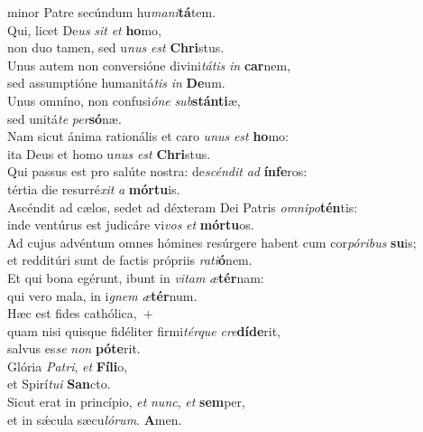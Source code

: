 \oddverse minor Patre secúndum hu\textit{ma}\textit{ni}\textbf{tá}tem.\\
\evenverse Qui, licet De\textit{us} \textit{sit} \textit{et} \textbf{ho}mo,~\*\\
\evenverse non duo tamen, sed u\textit{nus} \textit{est} \textbf{Chri}stus.\\
\oddverse Unus autem non conversióne divini\textit{tá}\textit{tis} \textit{in} \textbf{car}nem,~\*\\
\oddverse sed assumptióne humanitá\textit{tis} \textit{in} \textbf{De}um.\\
\evenverse Unus omníno, non confusi\textit{ó}\textit{ne} \textit{sub}\textbf{stán}\textbf{ti}æ,~\*\\
\evenverse sed unitá\textit{te} \textit{per}\textbf{só}næ.\\
\oddverse Nam sicut ánima rationális et caro \textit{u}\textit{nus} \textit{est} \textbf{ho}mo:~\*\\
\oddverse ita Deus et homo u\textit{nus} \textit{est} \textbf{Chri}stus.\\
\evenverse Qui passus est pro salúte nostra: de\textit{scén}\textit{dit} \textit{ad} \textbf{ín}\textbf{fe}ros:~\*\\
\evenverse tértia die resurré\textit{xit} \textit{a} \textbf{mór}\textbf{tu}is.\\
\oddverse Ascéndit ad cælos, sedet ad déxteram Dei Patris \textit{om}\textit{ni}\textit{po}\textbf{tén}tis:~\*\\
\oddverse inde ventúrus est judicáre vi\textit{vos} \textit{et} \textbf{mór}\textbf{tu}os.\\
\evenverse Ad cujus advéntum omnes hómines resúrgere habent cum cor\textit{pó}\textit{ri}\textit{bus} \textbf{su}is;~\*\\
\evenverse et redditúri sunt de factis própriis \textit{ra}\textit{ti}\textbf{ó}nem.\\
\oddverse Et qui bona egérunt, ibunt in \textit{vi}\textit{tam} \textit{æ}\textbf{tér}nam:~\*\\
\oddverse qui vero mala, in i\textit{gnem} \textit{æ}\textbf{tér}num.\\
\evenverse Hæc est fides cathólica,~+\\
\evenverse  quam nisi quisque fidéliter firmi\textit{tér}\textit{que} \textit{cre}\textbf{dí}\textbf{de}rit,~\*\\
\evenverse salvus es\textit{se} \textit{non} \textbf{pó}\textbf{te}rit.\\
\oddverse Glória \textit{Pa}\textit{tri}, \textit{et} \textbf{Fí}\textbf{li}o,~\*\\
\oddverse et Spirí\textit{tu}\textit{i} \textbf{San}cto.\\
\evenverse Sicut erat in princípio, \textit{et} \textit{nunc}, \textit{et} \textbf{sem}per,~\*\\
\evenverse et in sǽcula sæcu\textit{ló}\textit{rum}. \textbf{A}men.\\
